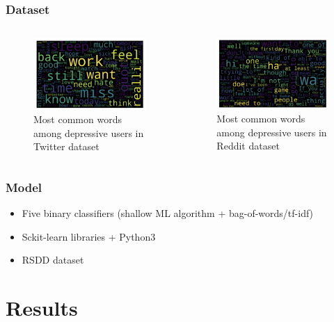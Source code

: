 \documentclass{beamer}
\begin{document}
\begin{frame}
	\frametitle{Dataset}	
	\begin{columns}[c] %
		
		\begin{figure}[h]
			\centering
			\includegraphics[width=6cm]{words1}
			\caption{Most common words among depressive users in Twitter dataset}
		\end{figure}
		
		\begin{figure}[h]
			\centering
			\includegraphics[width=6cm]{words2}
			\caption{Most common words among depressive users in Reddit dataset}
		\end{figure}
		
	\end{columns}	
\end{frame}

\begin{frame}
	\frametitle{Model}	
	\begin{itemize}
		\item Five binary classifiers (shallow ML algorithm + bag-of-words/tf-idf)
		\item Sckit-learn libraries + Python3
		\item RSDD dataset
	\end{itemize}
	
\end{frame}

\section{Results}
\end{document}
